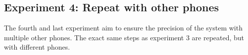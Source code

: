 \subsection{Experiment 4: Repeat with other phones}

The fourth and last experiment aim to ensure the precision of the system with multiple other phones. The exact same steps as experiment 3 are repeated, but with different phones.
